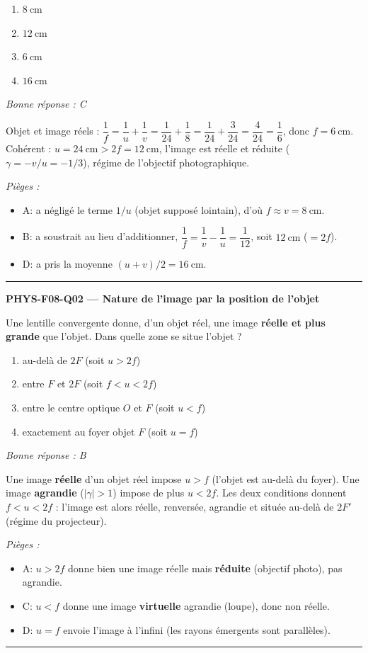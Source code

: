 \documentclass[11pt,a4paper]{article}
\begin{document}
\begin{enumerate}[label=\Alph*)]
\item $\qty{8}{\centi\metre}$
\item $\qty{12}{\centi\metre}$
\item $\qty{6}{\centi\metre}$
\item $\qty{16}{\centi\metre}$
\end{enumerate}
\textit{Bonne réponse : C}\par
Objet et image réels : $\dfrac1f=\dfrac1u+\dfrac1v=\dfrac1{24}+\dfrac18=\dfrac{1}{24}+\dfrac{3}{24}
=\dfrac{4}{24}=\dfrac16$, donc $f=\qty{6}{\centi\metre}$. Cohérent : $u=\qty{24}{\centi\metre}>2f=\qty{12}{\centi\metre}$,
l'image est réelle et réduite ($\gamma=-v/u=-1/3$), régime de l'objectif photographique.\par
\textit{Pièges :}
\begin{itemize}
\item A: a négligé le terme $1/u$ (objet supposé lointain), d'où $f\approx v=\qty{8}{\centi\metre}$.
\item B: a soustrait au lieu d'additionner, $\dfrac1f=\dfrac1v-\dfrac1u=\dfrac{1}{12}$, soit $\qty{12}{\centi\metre}$ ($=2f$).
\item D: a pris la moyenne $(u+v)/2=\qty{16}{\centi\metre}$.
\end{itemize}
\vspace{8pt}\hrule\vspace{8pt}

\noindent\textbf{PHYS-F08-Q02 --- Nature de l'image par la position de l'objet}\par
Une lentille convergente donne, d'un objet réel, une image \textbf{réelle et plus grande} que l'objet.
Dans quelle zone se situe l'objet ?
\begin{enumerate}[label=\Alph*)]
\item au-delà de $2F$ (soit $u>2f$)
\item entre $F$ et $2F$ (soit $f<u<2f$)
\item entre le centre optique $O$ et $F$ (soit $u<f$)
\item exactement au foyer objet $F$ (soit $u=f$)
\end{enumerate}
\textit{Bonne réponse : B}\par
Une image \textbf{réelle} d'un objet réel impose $u>f$ (l'objet est au-delà du foyer). Une image
\textbf{agrandie} ($|\gamma|>1$) impose de plus $u<2f$. Les deux conditions donnent $f<u<2f$ : l'image
est alors réelle, renversée, agrandie et située au-delà de $2F'$ (régime du projecteur).\par
\textit{Pièges :}
\begin{itemize}
\item A: $u>2f$ donne bien une image réelle mais \textbf{réduite} (objectif photo), pas agrandie.
\item C: $u<f$ donne une image \textbf{virtuelle} agrandie (loupe), donc non réelle.
\item D: $u=f$ envoie l'image à l'infini (les rayons émergents sont parallèles).
\end{itemize}
\vspace{8pt}\hrule\vspace{8pt}
\end{document}
